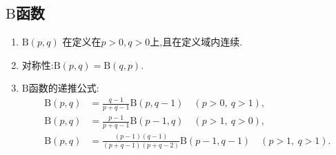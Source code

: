\documentclass[../../main.tex]{subfiles}%
\begin{document}
\subsection{$\mathrm{B}$函数}

\begin{theorem}\label{theorem:Beta函数的性质}
\begin{enumerate}[(1)]
\item  $\mathrm{B}(p,q)$ 在定义在$p>0,q>0$上,且在定义域内连续.

\item 对称性:$\mathrm{B}(p,q) = \mathrm{B}(q,p)$.

\item $\mathrm{B}$函数的递推公式:
\begin{align}
\mathrm{B}(p,q) &= \frac{q-1}{p+q-1}\mathrm{B}(p,q-1)\quad (p > 0,\ q > 1), \label{eq:B-recurrence-1} \\
\mathrm{B}(p,q) &= \frac{p-1}{p+q-1}\mathrm{B}(p-1,q)\quad (p > 1,\ q > 0), \label{eq:B-recurrence-2} \\
\mathrm{B}(p,q) &= \frac{(p-1)(q-1)}{(p+q-1)(p+q-2)}\mathrm{B}(p-1,q-1)\quad (p > 1,\ q > 1). \label{eq:B-recurrence-3}
\end{align}
\end{enumerate}
\end{theorem}
\end{document}
